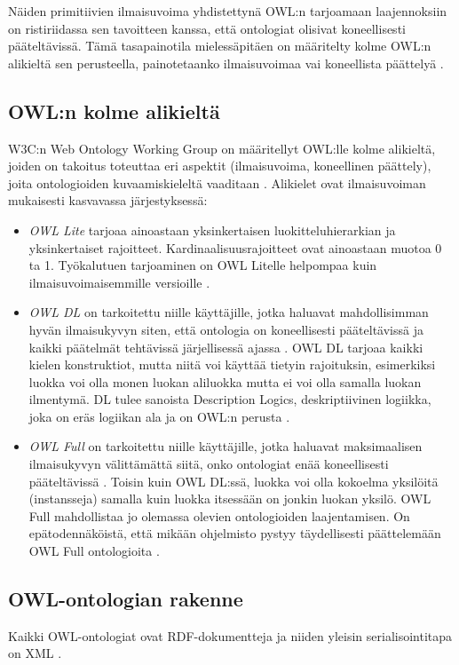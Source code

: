 \documentclass[finnish]{tktltiki2}
\theoremstyle{definition}
\theoremstyle{remark}
\begin{document}
Näiden primitiivien ilmaisuvoima yhdistettynä OWL:n tarjoamaan laajennoksiin
on ristiriidassa sen tavoitteen kanssa, että ontologiat olisivat koneellisesti
pääteltävissä. Tämä tasapainotila mielessäpitäen on määritelty kolme OWL:n
alikieltä sen perusteella, painotetaanko ilmaisuvoimaa vai koneellista päättelyä
\cite{AH09}.  

\subsection{OWL:n kolme alikieltä}

W3C:n Web Ontology Working Group on määritellyt OWL:lle kolme alikieltä, joiden
on takoitus toteuttaa eri aspektit (ilmaisuvoima, koneellinen päättely), joita
ontologioiden kuvaamiskieleltä vaaditaan \cite{MH04}. Alikielet ovat ilmaisuvoiman mukaisesti
kasvavassa järjestyksessä:

\begin{itemize}
 \item \textit{OWL Lite} tarjoaa ainoastaan yksinkertaisen luokitteluhierarkian ja yksinkertaiset rajoitteet\cite{MH04}. Kardinaalisuusrajoitteet ovat ainoastaan muotoa 0 ta 1. Työkalutuen tarjoaminen on OWL Litelle helpompaa kuin ilmaisuvoimaisemmille versioille \cite{MH04}.  
 \item \textit{OWL DL} on tarkoitettu niille käyttäjille, jotka haluavat mahdollisimman hyvän ilmaisukyvyn siten, että ontologia on koneellisesti pääteltävissä ja kaikki päätelmät tehtävissä järjellisessä ajassa \cite{MH04}. OWL DL tarjoaa kaikki kielen konstruktiot, mutta niitä voi käyttää tietyin rajoituksin, esimerkiksi luokka voi olla monen luokan aliluokka mutta ei voi olla samalla luokan ilmentymä. DL tulee sanoista Description Logics, deskriptiivinen logiikka, joka on eräs logiikan ala ja on OWL:n perusta \cite{MH04}.  
 \item \textit{OWL Full} on tarkoitettu niille käyttäjille, jotka haluavat maksimaalisen ilmaisukyvyn välittämättä siitä, onko ontologiat enää koneellisesti pääteltävissä \cite{MH04}. Toisin kuin OWL DL:ssä, luokka voi olla kokoelma yksilöitä (instansseja) samalla kuin luokka itsessään on jonkin luokan yksilö. OWL Full mahdollistaa jo olemassa olevien ontologioiden laajentamisen. On epätodennäköistä, että mikään ohjelmisto pystyy täydellisesti päättelemään OWL Full ontologioita \cite{MH04}. 
\end{itemize}

\subsection{OWL-ontologian rakenne}
Kaikki OWL-ontologiat ovat RDF-dokumentteja ja niiden yleisin serialisointitapa on XML  \cite{SWM04}.
\end{document}
